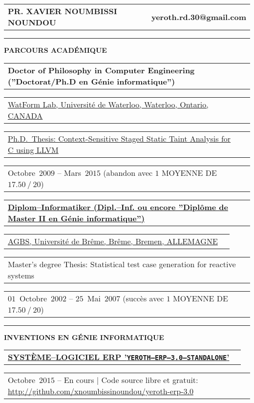 \documentclass[9pt,a4paper]{article} %
\makeatletter
\newcommand{\headerrow}[2]
{\begin{tabular*}{\linewidth}{l@{\extracolsep{\fill}}r}
	#1 &
	#2 \\
\end{tabular*}}
\newcommand{\headerrowONE}[1]{\headerrow{#1}{}}
\newcommand{\cvitemdate}[2]{#1~$#2$\xspace}
\makeatother
\begin{document}
\thispagestyle{OnlyFirstPage}

\bigskip


\headerrow
	{\Large \textbf{PR. XAVIER NOUMBISSI NOUNDOU}}	
	{\large \textbf{yeroth.rd.30@gmail.com}}

\vspace{1em}


\hrule
\begin{center}
{\large \textbf{PARCOURS ACADÉMIQUE}}
\end{center}

\vspace{0.5em}

\headerrowONE{\textbf{Doctor of Philosophy in Computer Engineering (''Doctorat/Ph.D en Génie informatique'')}}	
\headerrowONE{\href{http://watform.uwaterloo.ca/}{WatForm Lab, Université de Waterloo, Waterloo, Ontario, CANADA}}
\headerrowONE{\href{http://archive.org/details/yeroth-saint}{Ph.D.~Thesis: Context-Sensitive Staged Static Taint Analysis for C using LLVM}}
\headerrowONE{\cvitemdate{Octobre}{2009} -- \cvitemdate{Mars}{2015} (abandon avec $1$ MOYENNE DE $17.50~/~20$)}	
	
\vspace{0.3em}
	
\headerrowONE{\href{http://www.informatik.uni-bremen.de/agbs/qualifikationsarbeiten/diplomarbeiten_e.html}{\textbf{Diplom--Informatiker (Dipl.--Inf. ou encore ''Diplôme de Master II en Génie informatique'')}}}
\headerrowONE{\href{http://www.informatik.uni-bremen.de/agbs/}{AGBS, Université de Brême, Brême, Bremen, ALLEMAGNE}}	
\headerrowONE{Master's degree Thesis: Statistical test case generation for reactive systems}
\headerrowONE{\cvitemdate{$01$~Octobre}{2002} -- \cvitemdate{$25$~Mai}{2007} (succès avec $1$ MOYENNE DE $17.50~/~20$)}	

\vspace{1em}

\hrule
\begin{center}
{\large \textbf{INVENTIONS EN GÉNIE INFORMATIQUE}}
\end{center}

\vspace{0.5em}

\headerrowONE{\href{http://archive.org/details/yeroth-erp-3-0-info-english}{\textbf{SYSTÈME--LOGICIEL ERP '\texttt{YEROTH--ERP--3.0--STANDALONE}'}}}		
\headerrowONE{\cvitemdate{Octobre}{2015} -- En cours | Code source libre et gratuit: \url{http://github.com/xnoumbissinoundou/yeroth-erp-3.0}}
\end{document}
